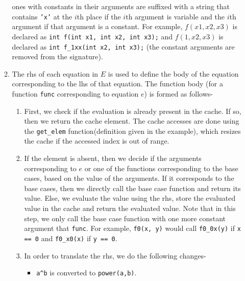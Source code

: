 \documentclass{article}
\begin{document}
\begin{itemize}
\begin{enumerate}
                ones with constants in their arguments are suffixed with a
                string that contains \texttt{'x'} at the $i$th place if the
                $i$th argument is variable and the $i$th argument if that
                argument is a constant. For example, $f(x1, x2, x3)$ is declared
                as \texttt{int f(int x1, int x2, int x3);} and $f(1, x2, x3)$ is
                declared as \texttt{int f\_1xx(int x2, int x3);} (the constant
                arguments are removed from the signature).
          \item The rhs of each equation in $E$ is used to define the body of
                the equation corresponding to the lhs of that equation. The
                function body (for a function \texttt{func} corresponding to
                equation $e$) is formed as follows-
                \begin{enumerate}
                  \item First, we check if the evaluation is already present in
                        the cache. If so, then we return the cache element. The
                        cache accesses are done using the \texttt{get\_elem}
                        function(definition given in the example), which resizes
                        the cache if the accessed index is out of range.
                  \item If the element is absent, then we decide if the
                        arguments corresponding to $e$ or one of the functions
                        corresponding to the base cases, based on the value of
                        the arguments. If it corresponds to the base cases, then
                        we directly call the base case function and return its
                        value. Else, we evaluate the value using the rhs, store
                        the evaluated value in the cache and return the
                        evaluated value. Note that in this step, we only call
                        the base case function with one more constant argument
                        that \texttt{func}. For example, \texttt{f0(x, y)} would
                        call \texttt{f0\_0x(y)} if \texttt{x == 0} and
                        \texttt{f0\_x0(x)} if \texttt{y == 0}.
                  \item In order to translate the rhs, we do the following
                        changes-
                        \begin{itemize}
                          \item \verb|a^b| is converted to \texttt{power(a,b)}.

\end{itemize}
\end{enumerate}
\end{enumerate}
\end{itemize}
\end{document}
